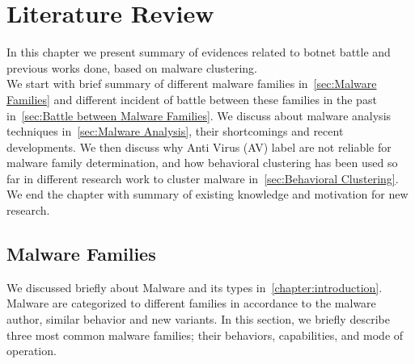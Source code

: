 \chapter{Literature Review}\label{chapter:literature_review}
In this chapter we present summary of evidences related to botnet battle and previous works done, based on malware clustering.\\
We start with brief summary of different malware families in~\autoref{sec:Malware Families} and different incident of battle between these families in the past in~\autoref{sec:Battle between Malware Families}.
We discuss about malware analysis techniques in~\autoref{sec:Malware Analysis}, their shortcomings and recent developments.
We then discuss why Anti Virus (AV) label are not reliable for malware family determination, and how behavioral clustering has been used so far in different research work to cluster malware in~\autoref{sec:Behavioral Clustering}.\\
We end the chapter with summary of existing knowledge and motivation for new research.
\section{Malware Families}
\label{sec:Malware Families}
We discussed briefly about Malware and its types in~\autoref{chapter:introduction}.
Malware are categorized to different families in accordance to the malware author, similar behavior and new variants.
In this section, we briefly describe three most common malware families; their behaviors, capabilities, and mode of operation.\\
